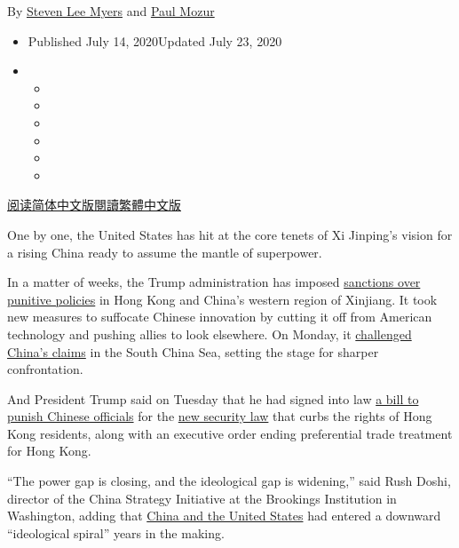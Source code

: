By \href{https://www.nytimes3xbfgragh.onion/by/steven-lee-myers}{Steven
Lee Myers} and
\href{https://www.nytimes3xbfgragh.onion/by/paul-mozur}{Paul Mozur}

\begin{itemize}
\item
  Published July 14, 2020Updated July 23, 2020
\item
  \begin{itemize}
  \item
  \item
  \item
  \item
  \item
  \item
  \end{itemize}
\end{itemize}

\href{https://cn.nytimes3xbfgragh.onion/asia-pacific/20200715/cold-war-china-us/}{阅读简体中文版}\href{https://cn.nytimes3xbfgragh.onion/asia-pacific/20200715/cold-war-china-us/zh-hant/}{閱讀繁體中文版}

One by one, the United States has hit at the core tenets of Xi Jinping's
vision for a rising China ready to assume the mantle of superpower.

In a matter of weeks, the Trump administration has imposed
\href{https://www.nytimes3xbfgragh.onion/2020/06/29/business/economy/us-halts-high-tech-exports-hong-kong.html}{sanctions
over punitive policies} in Hong Kong and China's western region of
Xinjiang. It took new measures to suffocate Chinese innovation by
cutting it off from American technology and pushing allies to look
elsewhere. On Monday, it
\href{https://www.nytimes3xbfgragh.onion/2020/07/13/world/asia/south-china-sea-pompeo.html}{challenged
China's claims} in the South China Sea, setting the stage for sharper
confrontation.

And President Trump said on Tuesday that he had signed into law
\href{https://www.nytimes3xbfgragh.onion/2020/07/02/us/politics/senate-china-hong-kong-sanctions.html}{a
bill to punish Chinese officials} for the
\href{https://www.nytimes3xbfgragh.onion/2020/06/29/world/asia/china-hong-kong-security-law-rules.html}{new
security law} that curbs the rights of Hong Kong residents, along with
an executive order ending preferential trade treatment for Hong Kong.

``The power gap is closing, and the ideological gap is widening,'' said
Rush Doshi, director of the China Strategy Initiative at the Brookings
Institution in Washington, adding that
\href{https://www.nytimes3xbfgragh.onion/2020/07/23/world/asia/us-china-consulate.html}{China
and the United States} had entered a downward ``ideological spiral''
years in the making.

